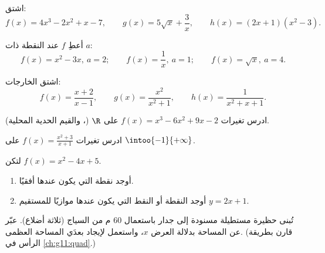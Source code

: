 \begin{exercise}[$\star$]\label{exo:g11:deriv:2}
اشتق:
\[
f(x) = 4x^3 - 2x^2 + x - 7, \qquad
g(x) = 5\sqrt{x} + \frac{3}{x}, \qquad
h(x) = (2x+1)(x^2 - 3) .
\]
\end{exercise}

\begin{exercise}[$\star$]\label{exo:g11:deriv:3}
أعطِ    $f$ عند النقطة ذات
 $a$:
\[
f(x) = x^2 - 3x, \ a = 2; \qquad
f(x) = \frac1x, \ a = 1; \qquad
f(x) = \sqrt x, \ a = 4 .
\]
\end{exercise}

\begin{exercise}[$\star$]\label{exo:g11:deriv:4}
اشتق الخارجات:
\[
f(x) = \frac{x+2}{x-1}, \qquad
g(x) = \frac{x^2}{x^2+1}, \qquad
h(x) = \frac{1}{x^2 + x + 1} .
\]
\end{exercise}

\begin{exercise}[$\star\star$]\label{exo:g11:deriv:5}
ادرس تغيرات $f(x) = x^3 - 6x^2 + 9x - 2$ على $\R$ (، والقيم الحدية المحلية).
\end{exercise}

\begin{exercise}[$\star\star$]\label{exo:g11:deriv:6}
ادرس تغيرات $f(x) = \frac{x^2 + 3}{x + 1}$ على
$\intoo{-1}{+\infty}$.
\end{exercise}

\begin{exercise}[$\star\star$]\label{exo:g11:deriv:7}
لتكن $f(x) = x^2 - 4x + 5$.
\begin{enumerate}
  \item أوجد نقطة  التي يكون  عندها أفقيًا.
  \item أوجد النقطة أو النقط التي يكون  عندها موازيًا للمستقيم
        $y = 2x + 1$.
\end{enumerate}
\end{exercise}

\begin{exercise}[$\star\star$]\label{exo:g11:deriv:8}
تُبنى حظيرة مستطيلة مسنودة إلى جدار باستعمال $60$ م من السياج
(ثلاثة أضلاع). عبّر عن المساحة بدلالة العرض $x$، واستعمل
 لإيجاد بعدَي المساحة العظمى. (قارن بطريقة
الرأس في \cref{ch:g11:quad}.)
\end{exercise}

